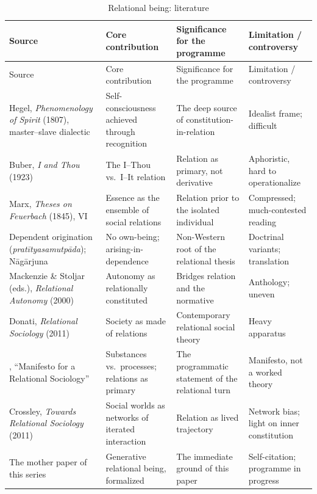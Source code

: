 \goldrule
\footnotesize
\begin{longtable}{Y Y Y Y}
\caption{Relational being: literature}\label{p07:tab:lit-relbeing}\\
\toprule
{}
Source & Core contribution & Significance for the programme & Limitation / controversy \\
\midrule
\endfirsthead
{}
Source & Core contribution & Significance for the programme & Limitation / controversy \\
\midrule
\endhead
Hegel, \emph{Phenomenology of Spirit} (1807), master--slave dialectic & Self-consciousness achieved through recognition & The deep source of constitution-in-relation & Idealist frame; difficult \\
Buber, \emph{I and Thou} (1923) & The I--Thou vs.\ I--It relation & Relation as primary, not derivative & Aphoristic, hard to operationalize \\
Marx, \emph{Theses on Feuerbach} (1845), VI & Essence as the ensemble of social relations & Relation prior to the isolated individual & Compressed; much-contested reading \\
Dependent origination (\emph{pratītyasamutpāda}); Nāgārjuna & No own-being; arising-in-dependence & Non-Western root of the relational thesis & Doctrinal variants; translation \\
Mackenzie \& Stoljar (eds.), \emph{Relational Autonomy} (2000) & Autonomy as relationally constituted & Bridges relation and the normative & Anthology; uneven \\
Donati, \emph{Relational Sociology} (2011) & Society as made of relations & Contemporary relational social theory & Heavy apparatus \\
\textcite{emirbayer1997manifesto}, ``Manifesto for a Relational Sociology'' & Substances vs.\ processes; relations as primary & The programmatic statement of the relational turn & Manifesto, not a worked theory \\
Crossley, \emph{Towards Relational Sociology} (2011) & Social worlds as networks of iterated interaction & Relation as lived trajectory & Network bias; light on inner constitution \\
The mother paper of this series & Generative relational being, formalized & The immediate ground of this paper & Self-citation; programme in progress \\
\bottomrule
\end{longtable}


